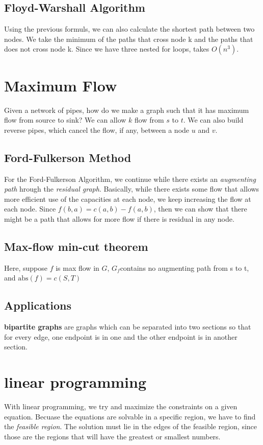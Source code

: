 \documentclass[landscape,4pt,a4paper]{article}
\begin{document}
\begin{multicols*}{5}
			\subsection{Floyd-Warshall Algorithm}
				Using the previous formuls, we can also calculate the shortest path between two nodes. We take the minimum of 
				the paths that cross node k and the paths that does not cross node k. Since we have three nested for loops, 
				takes $O(n^{3})$.
		\section{Maximum Flow}
				Given a network of pipes, how do we make a graph such that it has maximum flow from source to sink? We can 
				allow $k$ flow from $s$ to $t$. We can also build reverse pipes, which cancel the flow, if any, between 
				a node $u$ and $v$.
				\subsection{Ford-Fulkerson Method}
					For the Ford-Fulkerson Algorithm, we continue while there exists an \textit{augmenting path} 
					hrough the \textit{residual graph}. Basically, while there exists some flow that allows more efficient
					use of the capacities at each node, we keep increasing the flow at each node. Since $f(b,a) = c(a,b) - f(a,b)$,
					then we can show that there might be a path that allows for more flow if there is residual in any node. 
				\subsection{Max-flow min-cut theorem}
					Here, suppose $f$ is max flow in $G$, $G_{f}$contains no augmenting path from s to t, 
					and $\text{abs}(f)= c(S,T)$
				\subsection{Applications}
				\textbf{bipartite graphs} are graphs which can be separated into two sections so that for every edge, one 
				endpoint is in one and the other endpoint is in another section.
		\section{linear programming}
				With linear programming, we try and maximize the constraints on a given equation. Becuase the equations are 
				solvable in a specific region, we have to find the \textit{feasible region}. The solution must lie in the 
				edges of the feasible region, since those are the regions that will have the greatest or smallest numbers.

\end{multicols*}
\end{document}

